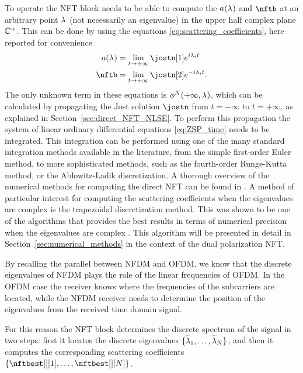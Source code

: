 To operate the \ac{NFT} block needs to be able to compute the \scatcoef{} $a(\lambda_{})$ and $\nftb$ at an arbitrary point $\lambda_{}$ (not necessarily an eigenvalue) in the upper half complex plane $\mathbb{C}^+$. This can be done by using the equations \eqref{eq:scattering_coefficients}, here reported for convenience
\begin{subequations}
\begin{align}
\nfta&=\lim_{t \to +\infty}\jostn[1]e^{i\eig[i] t}\\
\nftb&=
      \lim_{t \to +\infty}
       \jostn[2] e^{-i\eig[i] t}.\label{eq:scattering_coefficients_b_ch3}
\end{align}
\end{subequations}
The only unknown term in these equations is $\phi^{N}_{}(+\infty, \lambda_{})$, which can be calculated by propagating the Jost
solution $\jostn$ from $t=-\infty$ to $t=+\infty$, as explained in Section~\ref{sec:direct_NFT_NLSE}. To perform this propagation
the system of linear ordinary differential equations
\eqref{eq:ZSP_time} needs to be integrated. This integration
can be performed using one of the many standard
integration methods available in the literature, from the simple
first-order Euler method,  to  more sophisticated methods, such as the
fourth-order Runge-Kutta method, or the Ablowitz-Ladik discretization. A thorough
overview of the numerical methods for computing the direct \ac{NFT} can be found in
\cite{Yousefi2014a}. A method of particular interest for computing the
scattering coefficients when the eigenvalues are complex is the trapezoidal
discretization method. This was shown to be one of the algorithms that provides
the best results in terms of numerical precision  when the eigenvalues are
complex \cite{Aref2016c}. This algorithm will be presented in detail in
Section~\ref{sec:numerical_methods} in the context of the dual polarization \ac{NFT}.

By recalling the parallel between \ac{NFDM} and \ac{OFDM}, we know that the
discrete eigenvalues of \ac{NFDM} plays the role of the linear frequencies of
\ac{OFDM}. In the \ac{OFDM} case the receiver knows where the frequencies of the
subcarriers are located, while the \ac{NFDM} receiver needs to determine the
position of the eigenvalues from the received time domain signal.

For this reason the \ac{NFT} block determines the discrete spectrum of the signal in two steps:
first it locates the discrete eigenvalues $\{\eigest[1], \dots, \eigest [N]\}$, and
then it computes the corresponding scattering coefficients $\{\nftbest[][1], \dots, \nftbest[][N]\}$.

